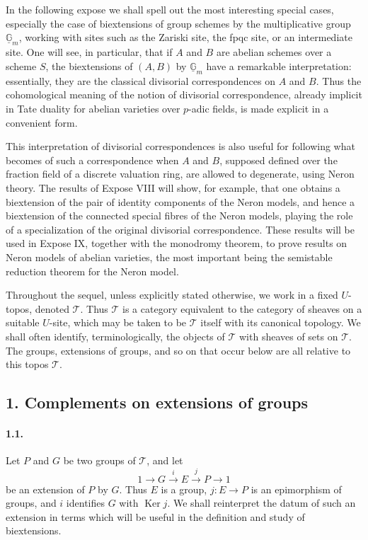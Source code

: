 \documentclass[11pt]{article}
\theoremstyle{plain}
\theoremstyle{definition}
\theoremstyle{remark}
\DeclareMathOperator{\Ker}{Ker}
\begin{document}
In the following expose we shall spell out the most interesting special cases, especially the case of biextensions of group schemes by the multiplicative group $\underline{\mathbb G}_m$, working with sites such as the Zariski site, the fpqc site, or an intermediate site. One will see, in particular, that if $A$ and $B$ are abelian schemes over a scheme $S$, the biextensions of $(A,B)$ by $\underline{\mathbb G}_m$ have a remarkable interpretation: essentially, they are the classical divisorial correspondences on $A$ and $B$. Thus the cohomological meaning of the notion of divisorial correspondence, already implicit in Tate duality for abelian varieties over $p$-adic fields, is made explicit in a convenient form.

This interpretation of divisorial correspondences is also useful for following what becomes of such a correspondence when $A$ and $B$, supposed defined over the fraction field of a discrete valuation ring, are allowed to degenerate, using Neron theory. The results of Expose VIII will show, for example, that one obtains a biextension of the pair of identity components of the Neron models, and hence a biextension of the connected special fibres of the Neron models, playing the role of a specialization of the original divisorial correspondence. These results will be used in Expose IX, together with the monodromy theorem, to prove results on Neron models of abelian varieties, the most important being the semistable reduction theorem for the Neron model.

Throughout the sequel, unless explicitly stated otherwise, we work in a fixed $U$-topos, denoted $\mathcal T$. Thus $\mathcal T$ is a category equivalent to the category of sheaves on a suitable $U$-site, which may be taken to be $\mathcal T$ itself with its canonical topology. We shall often identify, terminologically, the objects of $\mathcal T$ with sheaves of sets on $\mathcal T$. The groups, extensions of groups, and so on that occur below are all relative to this topos $\mathcal T$.

\subsection*{1. Complements on extensions of groups}

\paragraph{1.1.} Let $P$ and $G$ be two groups of $\mathcal T$, and let
\begin{equation}
1 \longrightarrow G \xrightarrow{i} E \xrightarrow{j} P \longrightarrow 1
\tag{1.1.1}
\end{equation}
be an extension of $P$ by $G$. Thus $E$ is a group, $j:E\to P$ is an epimorphism of groups, and $i$ identifies $G$ with $\Ker j$. We shall reinterpret the datum of such an extension in terms which will be useful in the definition and study of biextensions.
\end{document}
